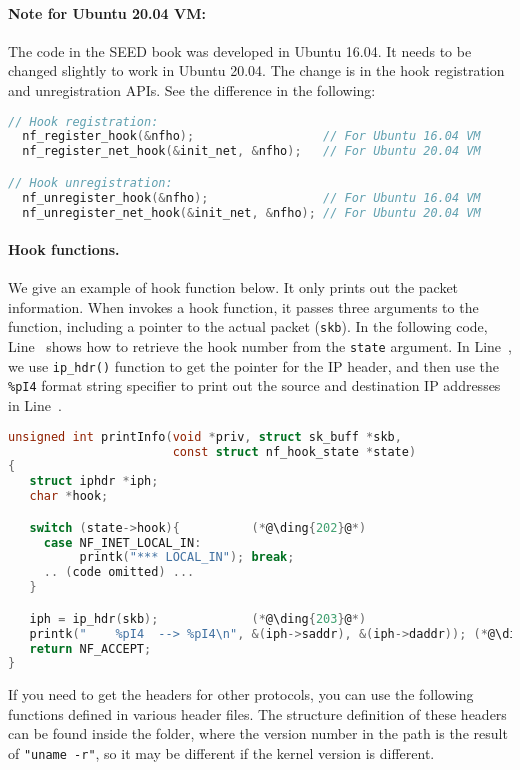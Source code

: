 \paragraph{Note for Ubuntu 20.04 VM:}
The code in the SEED book was developed in Ubuntu 16.04. It needs to be changed slightly 
to work in Ubuntu 20.04. The change is in the hook registration and 
unregistration APIs. See the difference in the following:

\begin{lstlisting}[language=C]
// Hook registration:
  nf_register_hook(&nfho);                  // For Ubuntu 16.04 VM
  nf_register_net_hook(&init_net, &nfho);   // For Ubuntu 20.04 VM

// Hook unregistration:
  nf_unregister_hook(&nfho);                // For Ubuntu 16.04 VM
  nf_unregister_net_hook(&init_net, &nfho); // For Ubuntu 20.04 VM
\end{lstlisting}
 

\paragraph{Hook functions.} We give an example of hook function
below. It only prints out the packet information.
When \netfilter invokes a hook function, it passes
three arguments to the function, including a pointer to the 
actual packet (\texttt{skb}). 
In the following code, Line~ shows how to retrieve 
the hook number from the \texttt{state} argument. 
In Line~, we use \texttt{ip\_hdr()} function
to get the pointer for the IP header,
and then use the \texttt{\%pI4} format string specifier
to print out the source and destination 
IP addresses in Line~.

\begin{lstlisting}[language=C, caption={An example of hook function}]
unsigned int printInfo(void *priv, struct sk_buff *skb,   
                       const struct nf_hook_state *state)
{
   struct iphdr *iph;
   char *hook;

   switch (state->hook){          (*@\ding{202}@*)
     case NF_INET_LOCAL_IN: 
          printk("*** LOCAL_IN"); break;
     .. (code omitted) ...
   }

   iph = ip_hdr(skb);             (*@\ding{203}@*)           
   printk("    %pI4  --> %pI4\n", &(iph->saddr), &(iph->daddr)); (*@\ding{204}@*)
   return NF_ACCEPT;
}
\end{lstlisting}

If you need to get the headers for other protocols, you can use the following
functions defined in various header files. The  
structure definition of these headers can be found 
inside the  
folder, where the version number in the path is the result 
of \texttt{"uname -r"}, so it may be different if the kernel version
is different. 

